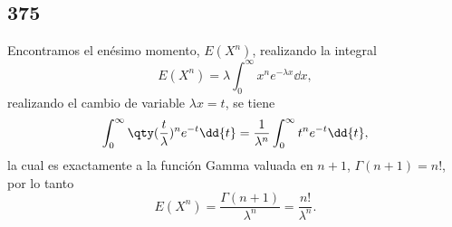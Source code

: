 \subsection*{375}
Encontramos el enésimo momento, $E(X^n)$, realizando la integral
	$$E(X^n) = \lambda \int _0 ^\infty x^n e^{-\lambda x} \dd{x},$$
realizando el cambio de variable $\lambda x = t$, se tiene
	$$\int _0 ^\infty \qty(\frac{t}{\lambda})^n e^{-t} \dd{t} = \frac{1}{\lambda ^n} \int _0 ^\infty t^n e^{-t} \dd{t},$$
la cual es exactamente a la función Gamma valuada en $n+1$, $\Gamma (n+1) = n!$, por lo tanto
	$$E(X^n) = \frac{\Gamma (n+1)}{\lambda ^n} = \frac{n!}{\lambda ^n}.$$















